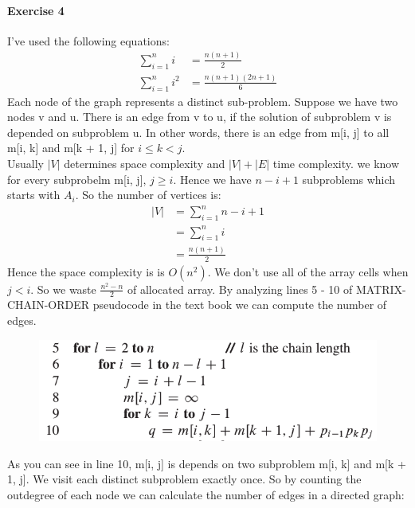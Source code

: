 \documentclass{book}
\begin{document}
	\paragraph{Exercise 4}
	I've used the following equations:
	\begin{align}
	\sum_{i = 1}^{n} i &= \frac{n(n + 1)}{2}\\
	\sum_{i = 1}^{n} i^2 &= \frac{n(n + 1)(2n + 1)}{6}
	\end{align}
	Each node of the graph represents a distinct sub-problem. Suppose we have two nodes v and u. There is an edge from v to u, if the solution of subproblem v is depended on subproblem u. In other words, there is an edge from m[i, j] to all m[i, k] and m[k + 1, j] for $i \le k < j$. \\
	Usually $|V|$ determines space complexity and $|V| + |E|$ time complexity. we know for every subprobelm m[i, j], $j \ge i$. Hence we have $n - i + 1$ subproblems which starts with $A_i$. So the number of vertices is:
	\begin{equation}
	\begin{split}
	|V| &= \sum_{i = 1}^{n}{n - i + 1} \\
	&= \sum_{i=1}^{n}i \\
	&= \frac{n(n + 1)}{2}
	\end{split}
	\end{equation}
	Hence the space complexity is is $O(n^2)$. We don't use all of the array cells when $j < i$. So we waste $\frac{n^2 - n}{2}$ of allocated array. By analyzing lines 5 - 10 of MATRIX-CHAIN-ORDER pseudocode in the text book we can compute the number of edges.
	\begin{figure}[h!]
	\includegraphics[width=\linewidth]{images/15/15-2-4.png}
	\end{figure}
	As you can see in line 10, m[i, j] is depends on two subproblem m[i, k] and m[k + 1, j]. We visit each distinct subproblem exactly once. So by counting the outdegree of each node we can calculate the number of edges in a directed graph:
\end{document}
